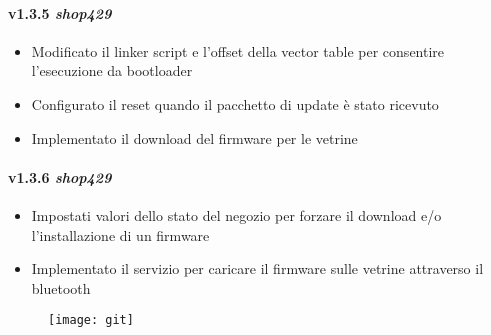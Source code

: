 \paragraph{v1.3.5 \textit{shop429}}
  \begin{itemize}
  	\item Modificato il linker script e l'offset della vector table per consentire l'esecuzione da bootloader
    \item Configurato il reset quando il pacchetto di update \`e stato ricevuto
    \item Implementato il download del firmware per le vetrine
  \end{itemize}
\paragraph{v1.3.6 \textit{shop429}}
  \begin{itemize}
  	\item Impostati valori dello stato del negozio per forzare il download e/o l'installazione di un firmware
    \item Implementato il servizio per caricare il firmware sulle vetrine attraverso il bluetooth
  \end{itemize}

\begin{figure}[hb]
  \center
  \vspace{10em}
	\texttt{[image: git]}
\end{figure}
